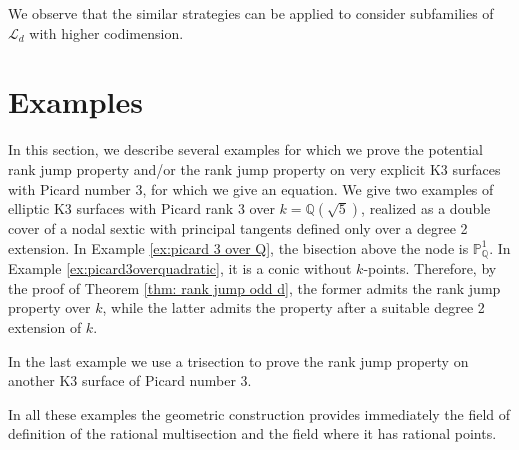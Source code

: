 \documentclass{amsart}
\theoremstyle{definition}
\numberwithin{equation}{section}
\begin{document}
We observe that the similar strategies can be applied to consider subfamilies of $\mathcal{L}_d$ with higher codimension.


\section{Examples}\label{section: examples}

In this section, we describe several examples for which we prove the potential rank jump property and/or the rank jump property on very explicit K3 surfaces with Picard number 3, for which we give an equation. 
We give two examples of elliptic K3 surfaces with Picard rank 3 over $k=\mathbb{Q}(\sqrt{5})$, realized as a double cover of a nodal sextic with principal tangents defined only over a degree 2 extension. In Example \ref{ex:picard 3 over Q}, the bisection above the node is $\mathbb{P}^1_{\mathbb{Q}}$. In Example \ref{ex:picard3overquadratic}, it is a conic without $k$-points. Therefore, by the proof of Theorem \ref{thm: rank jump odd d}, the former admits the rank jump property over $k$, while the latter admits the property after a suitable degree 2 extension of $k$. 

In the last example we use a trisection to prove the  rank jump property on another K3 surface of Picard number 3.

In all these examples the geometric construction provides immediately the field of definition of the rational multisection and the field where it has rational points.
\end{document}
